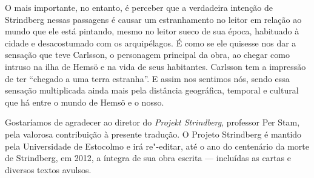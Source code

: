 O mais importante, no entanto, é perceber que a verdadeira intenção de
Strindberg nessas passagens é causar um estranhamento no leitor em
relação ao mundo que ele está pintando, mesmo no leitor sueco de sua
época, habituado à cidade e desacostumado com os arquipélagos. É como
se ele quisesse nos dar a sensação que teve Carlsson, o personagem
principal da obra, ao chegar como intruso na ilha de Hemsö e na vida de
seus habitantes. Carlsson tem a impressão de ter “chegado a uma
terra estranha”. E assim nos sentimos nós, sendo essa sensação
multiplicada ainda mais pela distância geográfica, temporal e cultural
que há entre o mundo de Hemsö e o nosso.
\asterisc

Gostaríamos de agradecer ao diretor do \textit{Projekt Strindberg}, professor
Per Stam, pela valorosa contribuição à presente tradução. O Projeto
Strindberg é mantido pela Universidade de Estocolmo e irá re"-editar,
até o ano do centenário da morte de Strindberg, em 2012, a íntegra de
sua obra escrita --- incluídas as cartas e diversos textos avulsos. 




